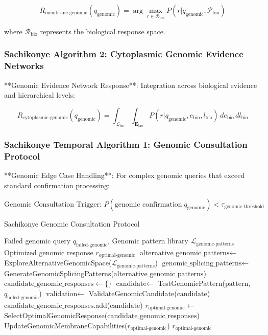 \documentclass[12pt,a4paper]{article}
\begin{document}
\begin{equation}
R_{\text{membrane-genomic}}(q_{\text{genomic}}) = \arg\max_{r \in \mathcal{R}_{\text{bio}}} P(r | q_{\text{genomic}}, \mathcal{P}_{\text{bio}})
\end{equation}

where $\mathcal{R}_{\text{bio}}$ represents the biological response space.

\subsubsection{Sachikonye Algorithm 2: Cytoplasmic Genomic Evidence Networks}

**Genomic Evidence Network Response**: Integration across biological evidence and hierarchical levels:

\begin{equation}
R_{\text{cytoplasmic-genomic}}(q_{\text{genomic}}) = \int_{\mathcal{L}_{\text{bio}}} \int_{\mathbf{E}_{\text{bio}}} P(r | q_{\text{genomic}}, e_{\text{bio}}, l_{\text{bio}}) \, de_{\text{bio}} \, dl_{\text{bio}}
\end{equation}

\subsubsection{Sachikonye Temporal Algorithm 1: Genomic Consultation Protocol}

**Genomic Edge Case Handling**: For complex genomic queries that exceed standard confirmation processing:

\begin{equation}
\text{Genomic Consultation Trigger: } P(\text{genomic confirmation} | q_{\text{genomic}}) < \tau_{\text{genomic-threshold}}
\end{equation}

\begin{algorithm}
\caption{Sachikonye Genomic Consultation Protocol}
\begin{algorithmic}[1]
\Require Failed genomic query $q_{\text{failed-genomic}}$, Genomic pattern library $\mathcal{L}_{\text{genomic-patterns}}$
\Ensure Optimized genomic response $r_{\text{optimal-genomic}}$
\State $\text{alternative\_genomic\_patterns} \leftarrow$ ExploreAlternativeGenomicSpace($\mathcal{L}_{\text{genomic-patterns}}$)
\State $\text{genomic\_splicing\_patterns} \leftarrow$ GenerateGenomicSplicingPatterns($\text{alternative\_genomic\_patterns}$)
\State $\text{candidate\_genomic\_responses} \leftarrow \{\}$
    \State $\text{candidate} \leftarrow$ TestGenomicPattern($\text{pattern}$, $q_{\text{failed-genomic}}$)
    \State $\text{validation} \leftarrow$ ValidateGenomicCandidate($\text{candidate}$)
        \State $\text{candidate\_genomic\_responses}$.add($\text{candidate}$)
    \EndIf
\EndFor
\State $r_{\text{optimal-genomic}} \leftarrow$ SelectOptimalGenomicResponse($\text{candidate\_genomic\_responses}$)
\State UpdateGenomicMembraneCapabilities($r_{\text{optimal-genomic}}$)
\Return $r_{\text{optimal-genomic}}$
\end{algorithmic}
\end{algorithm}
\end{document}
